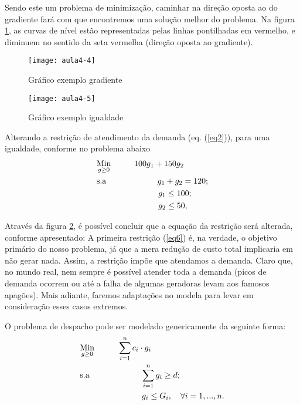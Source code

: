 Sendo este um problema de minimização, caminhar na direção oposta ao do gradiente fará com que encontremos uma solução melhor do problema. Na figura \ref{fig:aula4-4}, as curvas de nível estão representadas pelas linhas pontilhadas em vermelho, e diminuem no sentido da seta vermelha (direção oposta ao gradiente).

\begin{figure}[H]
\begin{centering}
\texttt{[image: aula4-4]}\protect\caption{\label{fig:aula4-4} Gráfico exemplo gradiente }
\end{centering}
\end{figure}

\begin{figure}[H]
\begin{centering}
\texttt{[image: aula4-5]}\protect\caption{\label{fig:aula4-5} Gráfico exemplo igualdade}
\end{centering}
\end{figure}

Alterando a restrição de atendimento da demanda (eq. (\ref{eq2})), para uma igualdade, conforme no problema abaixo
\begin{align}
    & \underset{g\geq0}{\text{Min}} \hspace{1cm} 100g_1+150g_2 \label{eq5} \\
    & \text{s.a}  \hspace{2.2cm} g_1+g_2 = 120; \label{eq6} \\
    &             \hspace{2.65cm} g_1\leq 100; \label{eq7}\\
    &             \hspace{2.65cm} g_2\leq 50, \label{eq8}
\end{align}

Através da figura \ref{fig:aula4-5}, é possível concluir que a equação da restrição será alterada, conforme apresentado:
A primeira restrição (\ref{eq6}) é, na verdade, o objetivo primário do nosso problema, já que a mera redução de custo total implicaria em não gerar nada. Assim, a restrição impõe que atendamos a demanda. Claro que, no mundo real, nem sempre é possível atender toda a demanda (picos de demanda ocorrem ou até a falha de algumas geradoras levam aos famosos apagões). Mais adiante, faremos adaptações no modela para levar em consideração esses casos extremos.

O problema de despacho pode ser modelado genericamente da seguinte forma:
\begin{align}
    & \underset{g\geq0}{\text{Min}} \hspace{1cm} \sum_{i=1}^{n}c_{i}\cdot g_{i} \label{eq9} \\
    & \text{s.a}  \hspace{2.2cm} \sum_{i=1}^{n}g_{i}\geq d; \label{eq10} \\
    &             \hspace{2.65cm}g_{i}\leq G_{i}, \quad \forall i=1,...,n. \label{eq11}
\end{align}

